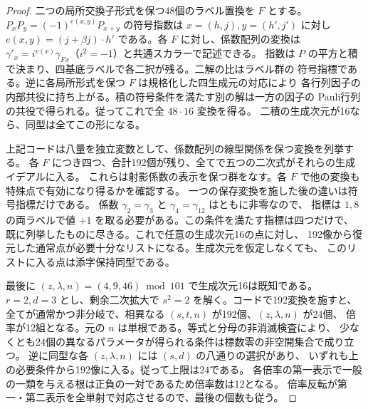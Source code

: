 \begin{proof}
二つの局所交換子形式を保つ48個のラベル置換を $F$ とする。
$P_xP_y=(-1)^{e(x,y)}P_{x+y}$ の符号指数は $x=(h,j),y=(h',j')$ に対し
$e(x,y)=(j+\beta j)\cdot h'$ である。各 $F$ に対し、係数配列の変換は
$\gamma'_x=i^{v(x)}\gamma_{Fx}$（$i^2=-1$）と共通スカラーで記述できる。
指数は $P$ の平方と積で決まり、四基底ラベルで各二択が残る。二解の比はラベル群の
符号指標である。逆に各局所形式を保つ $F$ は規格化した四生成元の対応により
各行列因子の内部共役に持ち上がる。積の符号条件を満たす別の解は一方の因子の
Pauli行列の共役で得られる。従ってこれで全 $48\cdot16$ 変換を得る。
二積の生成次元が16なら、同型は全てこの形になる。

上記コードは八量を独立変数として、係数配列の線型関係を保つ変換を列挙する。
各 $F$ につき四つ、合計192個が残り、全てで五つの二次式がそれらの生成イデアルに入る。
これらは射影係数の表示を保つ群をなす。各 $F$ で他の変換も特殊点で有効になり得るかを確認する。
一つの保存変換を施した後の違いは符号指標だけである。
係数 $\gamma_2=\gamma_3$ と $\gamma_4=\gamma_{12}$ はともに非零なので、
指標は $1,8$ の両ラベルで値 $+1$ を取る必要がある。この条件を満たす指標は四つだけで、
既に列挙したものに尽きる。これで任意の生成次元16の点に対し、
192像から復元した通常点が必要十分なリストになる。生成次元を仮定しなくても、
このリストに入る点は添字保持同型である。

最後に $(z,\lambda,n)=(4,9,46)\bmod101$ で生成次元16は既知である。
$r=2,d=3$ とし、剰余二次拡大で $s^2=2$ を解く。コードで192変換を施すと、
全てが通常かつ非分岐で、相異なる $(s,t,n)$ が192個、$(z,\lambda,n)$ が24個、
倍率が12組となる。元の $n$ は単根である。等式と分母の非消滅検査により、
少なくとも24個の異なるパラメータが得られる条件は標数零の非空開集合で成り立つ。
逆に同型な各 $(z,\lambda,n)$ には $(s,d)$ の八通りの選択があり、
いずれも上の必要条件から192像に入る。従って上限は24である。
各倍率の第一表示で一般の一類を与える根は正負の一対であるため倍率数は12となる。
倍率反転が第一・第二表示を全単射で対応させるので、最後の個数も従う。
\end{proof}
